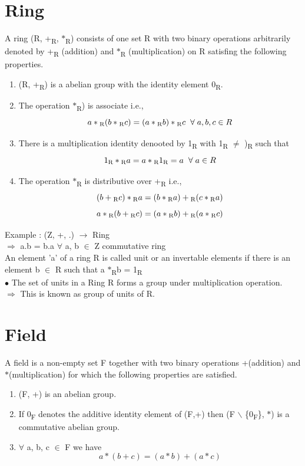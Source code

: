 \documentclass[11pt]{article}
\begin{document}
	\section{Ring}
	A ring (R, +\textsubscript{R}, $\ast$\textsubscript{R}) consists of one set R with two binary operations arbitrarily denoted by +\textsubscript{R} (addition) and $\ast$\textsubscript{R} (multiplication) on R satisfing the following properties.
	\begin{enumerate}
		\item (R, +\textsubscript{R}) is a abelian group with the identity element 0\textsubscript{R}.
		\item The operation $\ast$\textsubscript{R}) is associate i.e., $$a\ast\textsubscript{R}(b\ast\textsubscript{R}c) = (a\ast\textsubscript{R}b)\ast\textsubscript{R}c\hspace{0.2cm} \forall\hspace{0.1cm} a,b,c \in R$$
		\item There is a multiplication identity denooted by 1\textsubscript{R} with 1\textsubscript{R} $\neq$ )\textsubscript{R} such that $$1\textsubscript{R}\ast\textsubscript{R}a = a\ast\textsubscript{R}1\textsubscript{R} = a\hspace{0.2cm} \forall\hspace{0.1cm} a \in R$$
		\item The operation $\ast$\textsubscript{R} is distributive over +\textsubscript{R} i.e.,$$(b+\textsubscript{R}c)\ast\textsubscript{R}a = (b\ast\textsubscript{R}a)+\textsubscript{R}(c\ast\textsubscript{R}a)$$
		$$a\ast\textsubscript{R}(b+\textsubscript{R}c) = (a\ast\textsubscript{R}b)+\textsubscript{R}(a\ast\textsubscript{R}c)$$
	\end{enumerate}
	Example : (Z, +, .) $\rightarrow$ Ring\\
	$\Rightarrow$ a.b = b.a $\forall$ a, b $\in$ Z commutative ring \\
	An element 'a' of a ring R is called unit or an invertable elements if there is an element b $\in$ R such that a $\ast$\textsubscript{R}b = 1\textsubscript{R}\\
	$\bullet$ The set of units in a Ring R forms a group under multiplication operation.\\
	$\Rightarrow$ This is known as group of units of R.
	
	
	
	\section{Field}
	A field is a non-empty set F together with two binary operations +(addition) and $\ast$(multiplication) for which the following properties are satisfied.
	\begin{enumerate}
		\item (F, +) is an abelian group.
		\item If 0\textsubscript{F} denotes the additive identity element of (F,+) then (F $\backslash$ \{0\textsubscript{F}\}, $\ast$) is a commutative abelian group.
		\item $\forall$ a, b, c $\in$ F we have
		$$ a*(b+c) = (a*b) + (a*c)$$
	\end{enumerate}
	
\end{document}
